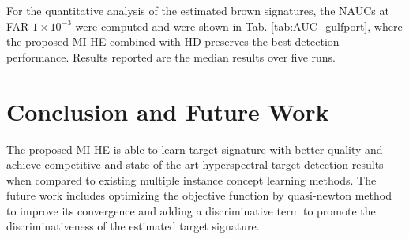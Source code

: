 \documentclass{article}
\begin{document}
For the quantitative analysis of the estimated brown signatures, the NAUCs  at FAR $1\times 10^{-3}$ were computed and were shown in Tab. \ref{tab:AUC_gulfport}, where the proposed MI-HE combined with HD preserves the best detection performance. Results reported are the median results over five runs.  



%





	
	
	
	\section{Conclusion and Future Work}
	\label{sec:conclusion}
	
	The proposed MI-HE is able to learn target signature with better quality and achieve competitive and state-of-the-art hyperspectral target detection results when compared to existing multiple instance concept learning methods.
The future work includes optimizing the objective function by quasi-newton method to improve its convergence and adding a discriminative term to promote the discriminativeness of the estimated target signature.
	
	
	
	
\end{document}
